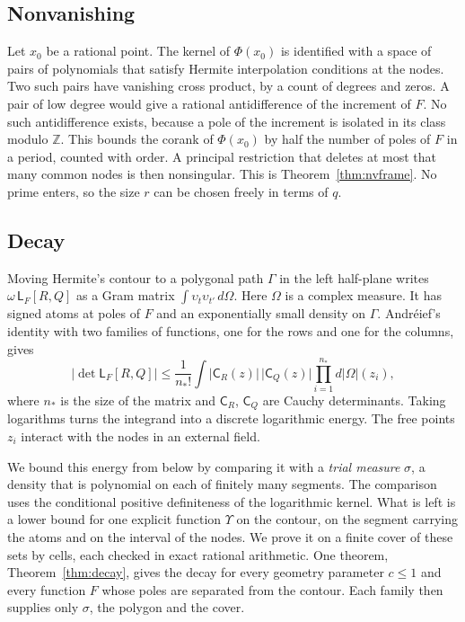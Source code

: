 \documentclass[11pt]{amsart}
\theoremstyle{definition}
\theoremstyle{remark}
\numberwithin{equation}{section}
\newcommand{\Z}{\mathbb Z}
\newcommand{\Lw}{\mathsf L}          %
\begin{document}
\subsection{Nonvanishing}
Let $x_0$ be a rational point. The kernel of $\Phi(x_0)$ is identified with a space of pairs of polynomials that satisfy
Hermite interpolation conditions at the nodes. Two such pairs have vanishing cross product, by a count of degrees and
zeros. A pair of low degree would give a rational antidifference of the increment of $F$. No such
antidifference exists, because a pole of the increment is isolated in its class modulo $\Z$. This bounds the corank of
$\Phi(x_0)$ by half the number of poles of $F$ in a period, counted with order. A principal restriction that
deletes at most that many common nodes is then nonsingular. This is Theorem~\ref{thm:nvframe}. No prime enters, so
the size $r$ can be chosen freely in terms of $q$.

\subsection{Decay}
Moving Hermite's contour to a polygonal path $\Gamma$ in the left half-plane writes $\omega\,\Lw_F[R,Q]$ as a Gram matrix
$\int\upsilon_t\upsilon_{t'}\,d\Omega$. Here $\Omega$ is a complex measure. It has signed atoms at poles of $F$ and an
exponentially small density on $\Gamma$. Andr\'eief's identity with two families of functions, one for the rows and one
for the columns, gives
\[
 |\det\Lw_F[R,Q]|\le\frac1{n_*!}\int\bigl|\mathsf C_R(z)\bigr|\,\bigl|\mathsf C_Q(z)\bigr|\prod_{i=1}^{n_*}d|\Omega|(z_i),
\]
where $n_*$ is the size of the matrix and $\mathsf C_R$, $\mathsf C_Q$ are Cauchy determinants. Taking logarithms turns
the integrand into a discrete logarithmic energy. The free points $z_i$ interact with the nodes in an external field.

We bound this energy from below by comparing it with a \emph{trial measure} $\sigma$, a density that is polynomial on
each of finitely many segments. The comparison uses the conditional positive definiteness of the logarithmic kernel.
What is left is a lower bound for one explicit function $\Upsilon$ on the contour, on the segment carrying the atoms and
on the interval of the nodes. We prove it on a finite cover of these sets by cells, each checked in exact rational
arithmetic. One theorem, Theorem~\ref{thm:decay}, gives the decay for every geometry parameter $c\le1$ and every
function $F$ whose poles are separated from the contour. Each family then supplies only $\sigma$, the polygon and the
cover.
\end{document}
